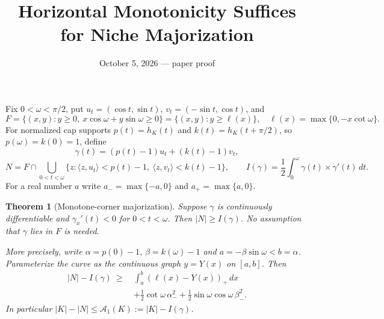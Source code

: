 \documentclass[11pt]{article}
\title{Horizontal Monotonicity Suffices for Niche Majorization}
\author{}\date{October 5, 2026 --- paper proof}
\newtheorem{theorem}{Theorem}
\newcommand{\ip}[2]{\langle #1,#2\rangle}
\begin{document}
\maketitle
Fix $0<\omega<\pi/2$, put $u_t=(\cos t,\sin t)$, $v_t=(-\sin t,\cos t)$, and
\[
 F=\{(x,y):y\ge0,\ x\cos\omega+y\sin\omega\ge0\}
   =\{(x,y):y\ge\ell(x)\},\quad \ell(x)=\max\{0,-x\cot\omega\}.
\]
For normalized cap supports $p(t)=h_K(t)$ and $k(t)=h_K(t+\pi/2)$, so $p(\omega)=k(0)=1$, define
\[
 \gamma(t)=(p(t)-1)u_t+(k(t)-1)v_t,
\]
\[
 N=F\cap\bigcup_{0<t<\omega}
 \{z:\ip z{u_t}<p(t)-1,\ \ip z{v_t}<k(t)-1\},\qquad
 I(\gamma)=\frac12\int_0^\omega\gamma(t)\times\gamma'(t)\,dt.
\]
For a real number $a$ write $a_- =\max\{-a,0\}$ and $a_+=\max\{a,0\}$.

\begin{theorem}[Monotone-corner majorization]
Suppose $\gamma$ is continuously differentiable and $\gamma_x'(t)<0$ for $0<t<\omega$. Then $|N|\ge I(\gamma)$. No assumption that $\gamma$ lies in $F$ is needed.

More precisely, write $\alpha=p(0)-1$, $\beta=k(\omega)-1$ and $a=-\beta\sin\omega<b=\alpha$. Parameterize the curve as the continuous graph $y=Y(x)$ on $[a,b]$. Then
\begin{align*}
 |N|-I(\gamma)\ \ge\
 &\int_a^b(\ell(x)-Y(x))_+\,dx\\
 &+\frac12\cot\omega\,\alpha_-^2
  +\frac12\sin\omega\cos\omega\,\beta_-^2.
\end{align*}
In particular $|K|-|N|\le\mathcal A_1(K):=|K|-I(\gamma)$.
\end{theorem}
\end{document}
